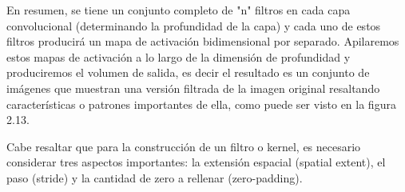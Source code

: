 		En resumen, se tiene un conjunto completo de "n"  filtros en cada capa convolucional (determinando la profundidad de la capa) y cada uno de estos filtros producirá un mapa de activación bidimensional por separado. Apilaremos estos mapas de activación a lo largo de la dimensión de profundidad y produciremos el volumen de salida, es decir el resultado es un conjunto de imágenes que muestran una versión filtrada de la imagen original resaltando características o patrones importantes de ella, como puede ser visto en la figura 2.13.

		\vskip 0.4cm  
		Cabe resaltar que para la construcción de un filtro o kernel, es necesario considerar tres aspectos importantes: la extensión espacial (spatial extent), el paso (stride) y la cantidad de zero a rellenar (zero-padding).
		\newpage
		
